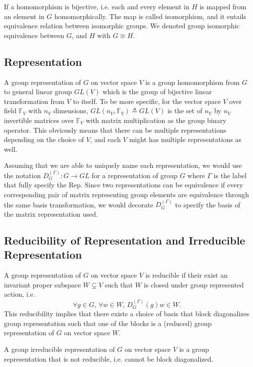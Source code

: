 \documentclass[preprint, 12pt]{revtex4-2}
\numberwithin{equation}{section}
\begin{document}
If a homomorphism is bijective, i.e. each and every element in $H$ is mapped from an element in $G$ homomorphically. The map is called isomorphism, and it entails equivalence relation between isomorphic groups. We denoted group isomorphic equivalence between $G$, and $H$ with $G\cong H$. 

\subsection{Representation}
A group representation of $G$ on vector space $V$ is a group homomorphism from $G$ to general linear group $GL(V)$ which is the group of bijective linear transformation from $V$ to itself. To be more specific, for the vector space $V$ over field $\mathbb{F}_V$ with $n_V$ dimensions, $GL(n_V, \mathbb{F}_V)\triangleq GL(V)$ is the set of $n_V$ by $n_V$ invertible matrices over $\mathbb{F}_V$ with matrix multiplication as the group binary operator. This obviously means that there can be multiple representations depending on the choice of $V$, and each $V$ might has multiple representations as well. 

Assuming that we are able to uniquely name each representation, we would use the notation $D_{G}^{(\Gamma)}:G\rightarrow GL$ for a representation of group $G$ where $\Gamma$ is the label that fully specify the Rep. Since two representations can be equivalence if every corresponding pair of matrix representing group elements are equivalence through the same basis transformation, we would decorate $D_{G}^{(\Gamma)}$ to specify the basis of the matrix representation used.

\subsection{Reducibility of Representation and Irreducible Representation}
A group representation of $G$ on vector space $V$ is reducible if their exist an invariant proper subspace $W\subsetneq V$ such that $W$ is closed under group represented action, i.e.
\begin{equation}\label{eq:invariant subspace}
    \forall g\in G,\,\forall w\in W,\, D_{G}^{(\Gamma)}(g)w\in W.
\end{equation}
This reducibility implies that there exists a choice of basis that block diagonalizes group representation such that one of the blocks is a (reduced) group representation of $G$ on vector space $W$.

A group irreducible representation of $G$ on vector space $V$ is a group representation that is not reducible, i.e. cannot be block diagonalized.
\end{document}
